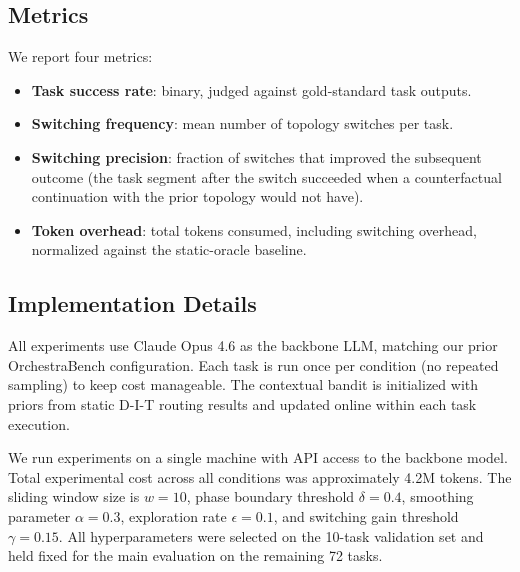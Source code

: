 \subsection{Metrics}\label{metrics}

We report four metrics:

\begin{itemize}
\item \textbf{Task success rate}: binary, judged against gold-standard task outputs.
\item \textbf{Switching frequency}: mean number of topology switches per task.
\item \textbf{Switching precision}: fraction of switches that improved the subsequent outcome (the task segment after the switch succeeded when a counterfactual continuation with the prior topology would not have).
\item \textbf{Token overhead}: total tokens consumed, including switching overhead, normalized against the static-oracle baseline.
\end{itemize}

\subsection{Implementation Details}\label{implementation-details}

All experiments use Claude Opus 4.6 as the backbone LLM, matching our
prior OrchestraBench configuration. Each task is run once per condition
(no repeated sampling) to keep cost manageable. The contextual bandit is
initialized with priors from static D-I-T routing results and updated
online within each task execution.

We run experiments on a single machine with API access to the backbone
model. Total experimental cost across all conditions was approximately
4.2M tokens. The sliding window size is \(w = 10\), phase boundary
threshold \(\delta = 0.4\), smoothing parameter \(\alpha = 0.3\),
exploration rate \(\epsilon = 0.1\), and switching gain threshold
\(\gamma = 0.15\). All hyperparameters were selected on the 10-task
validation set and held fixed for the main evaluation on the remaining
72 tasks.
